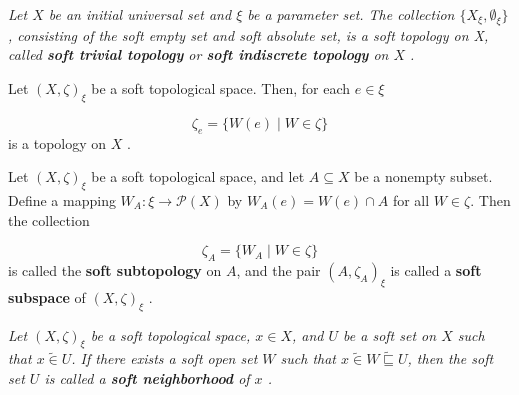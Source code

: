 \documentclass[preprint,12pt]{elsarticle}
\begin{document}
\begin{ex}\em{
 Let \( X \) be an initial universal set and \( \xi \) be a parameter set. The collection \( \{{X}_\xi,\emptyset_\xi  \} \), consisting of the soft empty set and soft absolute set, is a soft topology on X, called \textbf{soft trivial topology}
  or \textbf{soft indiscrete topology} on  $X$ \cite{Naz}.
  }
\end{ex}

\begin{prop}
Let \( (X, \zeta)_\xi \) be a soft topological space.
Then, for each \( e \in \xi\)

\[
\zeta_e = \{ W(e) \mid W \in \zeta \}
\]
is a topology on \( X \) \cite{Naz}.
\end{prop}
\begin{defn}\em{
Let \( (X, \zeta)_\xi \) be a soft topological space, and let \( A\subseteq X\) be a nonempty subset.
Define a mapping \( W_A:\xi \to \mathcal{P}(X)\) by
\(
W_A(e) = W(e) \cap A
\)
for all $W \in \zeta$.
Then the collection

\[
\zeta_A = \{ W_A \mid W \in \zeta \}
\]
is called the \textbf{soft subtopology} on \( A \), and the pair \( (A, \zeta_A)_\xi \) is called a \textbf{soft subspace} of \( (X, \zeta)_\xi \) \cite{Naz}.
}
\end{defn}
\begin{defn}\em{
 Let  \( (X, \zeta)_\xi \)  be a soft topological space,  \(x\in X \), and $U$ be a soft set on $X$ such that \( x \widetilde{\in} U \).
If there exists a soft open set $W$ such that \( x \widetilde{\in} W \widetilde{\sqsubseteq} U\), then the soft set \( U \) is called a \textbf{soft neighborhood} of \( x \) \cite{Naz}.
}
\end{defn}
\end{document}
